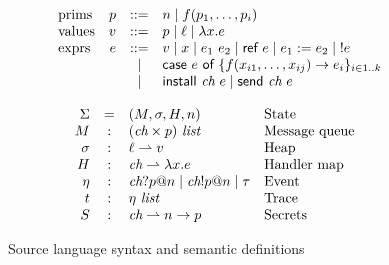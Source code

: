 \documentclass[conference]{IEEEtran}
\theoremstyle{definition}
\newcommand{\aset}[1]{\{#1\}}
\newcommand{\sfmt}[1]{\textsf{#1}}
\newcommand{\sch}{\textit{ch}}
\newcommand{\loc}{\ell}
\newcommand{\sassign}[2]{#1 := #2}
\newcommand{\scase}[2]{\sfmt{case}~#1~\sfmt{of}~#2}
\newcommand{\sderef}[1]{!#1}
\newcommand{\sinstall}[2]{\sfmt{install}~#1~#2}
\newcommand{\sref}[1]{\sfmt{ref}~#1}
\newcommand{\ssend}[2]{\sfmt{send}~#1~#2}
\newcommand{\sunit}{\sfmt{unit}}
\newcommand{\partialfun}{\rightharpoonup}
\newcommand{\xv}{p}
\newcommand{\typ}{\tau}
\newcommand{\tint}{\textit{int}}
\newcommand{\evt}{\eta}
\begin{document}
\begin{figure}[t]
  \begin{displaymath}
    \begin{array}{lrcl}
      \hbox{prims} & \xv & ::= & n \mid f(\xv_1, \ldots, \xv_i)  \\
      \hbox{values} & v & ::= & \xv \mid \loc \mid \lambda x.e \\
      \hbox{exprs} & e & ::= &
      v
      \mid x
      \mid e_1~e_2
      \mid \sref{e}
      \mid \sassign{e_1}{e_2}
      \mid \;\sderef{e} \\
      && \mid & \scase{e}{\aset{f(x_{i1}, \ldots, x_{ij}) \rightarrow
          e_i}_{i\in 1..k}} \\
      && \mid & \sinstall{\sch}{e}
      \mid \ssend{\sch}{e} \\
    \end{array}
  \end{displaymath}    

    
  \begin{displaymath}
    \begin{array}{rclp{1in}}
      \Sigma & = & (M, \sigma, H,n) & State \\
        M & : & (\sch \times p) ~ \textit{list} & Message queue \\
      \sigma & : & \loc \partialfun  v & Heap \\
      H & : & \sch \partialfun \lambda x.e & Handler map \\
      \evt & : & \sch ? p @ n \mid \sch ! p @ n \mid \tau & Event \\
      t & : & \evt ~ \textit{list} & Trace \\
      S & : & \sch \partialfun n \rightarrow p & Secrets
    \end{array}
  \end{displaymath}
  \caption{Source language syntax and semantic definitions}
  \label{fig:lang}
\end{figure}
\end{document}
